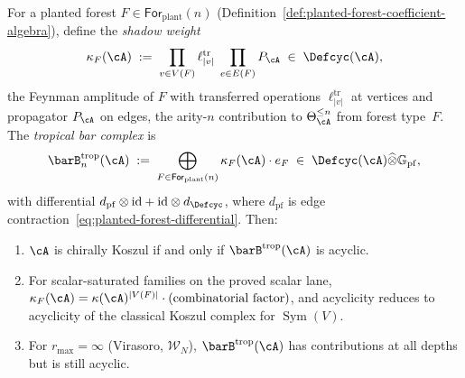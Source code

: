 \begin{theorem}
\label{conj:tropical-koszulness}%
\label{thm:tropical-koszulness}%
\ClaimStatusProvedHere
{}
For a planted forest
$F \in \mathsf{For}_{\mathrm{plant}}(n)$
\textup{(}Definition~\textup{\ref{def:planted-forest-coefficient-algebra})},
define the \emph{shadow weight}
\begin{equation}
\label{eq:shadow-weight-on-forest}
\kappa_F(\cA)
\;:=\;
\prod_{v \in V(F)}
\ell_{|v|}^{\mathrm{tr}}
\;\prod_{e \in E(F)} P_\cA
\;\in\; \Defcyc(\cA),
\end{equation}
the Feynman amplitude of $F$ with transferred operations
$\ell_{|v|}^{\mathrm{tr}}$ at vertices and propagator
$P_\cA$ on edges, the arity-$n$ contribution to
$\Theta_\cA^{\leq n}$ from forest type~$F$.
The \emph{tropical bar complex} is
\begin{equation}
\label{eq:tropical-bar-complex}
\barB^{\mathrm{trop}}_n(\cA)
\;:=\;
\bigoplus_{F \in \mathsf{For}_{\mathrm{plant}}(n)}
\kappa_F(\cA) \cdot e_F
\;\in\;
\Defcyc(\cA) \widehat\otimes \mathbb{G}_{\mathrm{pf}},
\end{equation}
with differential
$d_{\mathrm{pf}} \otimes \mathrm{id}
+ \mathrm{id} \otimes d_{\Defcyc}$,
where $d_{\mathrm{pf}}$ is edge
contraction~\eqref{eq:planted-forest-differential}.
Then:
\begin{enumerate}[label=\textup{(\roman*)}]
\item $\cA$ is chirally Koszul if and only if
  $\barB^{\mathrm{trop}}(\cA)$ is acyclic.
\item For scalar-saturated families on the proved scalar lane,
  $\kappa_F(\cA) = \kappa(\cA)^{|V(F)|} \cdot
  (\text{combinatorial factor})$, and acyclicity
  reduces to acyclicity of the classical Koszul
  complex for $\operatorname{Sym}(V)$.
\item For $r_{\max} = \infty$ (Virasoro,
  $\mathcal{W}_N$), $\barB^{\mathrm{trop}}(\cA)$
  has contributions at all depths but is still acyclic.
\end{enumerate}
\end{theorem}

